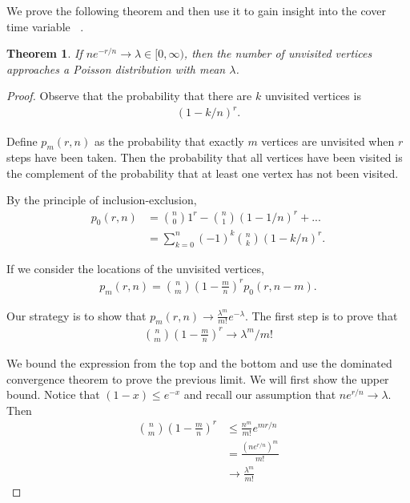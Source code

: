\documentclass[12pt]{article}
\newtheorem{theorem}{Theorem}
\theoremstyle{definition}
\DeclareMathOperator{\cov}{\uptau_\textrm{cov}}  %
\begin{document}
We prove the following theorem and then use it to gain insight into the cover time
variable $\cov$.
\begin{theorem}\label{thm:pois}
If $ne^{-r/n} \rightarrow \lambda \in [0, \infty)$, then the number of unvisited
vertices approaches a Poisson distribution with mean $\lambda$.
\end{theorem}

\begin{proof}
Observe that the probability that there are $k$ unvisited vertices is
\begin{align}
(1-k/n)^r \nonumber.
\end{align}

Define $p_m(r,n)$ as the probability that exactly $m$ vertices are unvisited
when $r$ steps have been taken.
Then the probability that all vertices have been visited is the complement
of the probability that at least one vertex has not been visited.

By the principle of inclusion-exclusion,
\begin{align}
p_0(r,n) &= {n \choose 0} 1^r - {n \choose 1} (1-1/n)^r + ... \nonumber\\
&= \sum_{k=0}^n (-1)^k {n \choose k} (1-k/n)^r. \nonumber
\end{align}

If we consider the locations of the unvisited vertices,
\begin{align}
p_m(r,n) = {n \choose m} \left(1-\frac{m}{n}\right)^r p_0(r, n-m). \nonumber
\end{align}

Our strategy is to show that $p_m(r,n) \rightarrow \frac{\lambda^m}{m!}e^{-\lambda}$.
The first step is to prove that
\begin{align}
{n \choose m} \left(1-\frac{m}{n}\right)^r \rightarrow \lambda ^m /m! \nonumber
\end{align}

We bound the expression from the top and the bottom and use the dominated convergence
theorem to prove the previous limit.
We will first show the upper bound.
Notice that $(1-x) \leq e^{-x}$ and recall our assumption that
$ne^{r/n} \rightarrow \lambda$.
Then
\begin{align}
{n \choose m} \left(1-\frac{m}{n}\right)^r &\leq \frac{n^m}{m!} e^{mr/n} \nonumber \\
&= \frac{(n e^{r/n})^m} {m!} \nonumber \\
&\rightarrow \frac{\lambda ^m} {m!} \nonumber
\end{align}


\end{proof}
\end{document}
